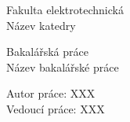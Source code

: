 \documentclass[oneside,12pt,a4paper,draft]{book}
\begin{document}
\titlepage
\hspace*{15pt}\textsf{Fakulta elektrotechnická}\\
\hspace*{15pt}\textsf{Název katedry}
\vspace{5cm}
\begin{center}
{\Huge\sc Bakalářská práce}\\
\vspace{1cm}
{\large\sf Název bakalářské práce}
\end{center}
\vfill
\begin{tabbing}
\sf Autor práce: XXX\\
\sf Vedoucí práce: XXX
\end{tabbing}
\rm
\clearpage 


\end{document}

